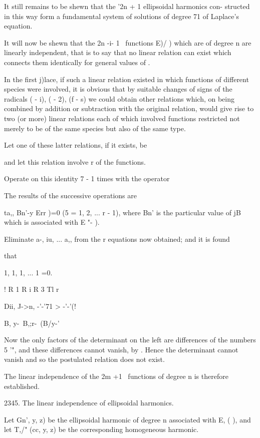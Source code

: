 {{{{{{{It still remains to be shewn that the '2n + 1 ellipsoidal harmonics
con- structed in this way form a fundamental system of solutions of
degree 71 of Laplace's equation.


It will now be shewn that the 2n -i- 1 \Lame\ functions E)/ ) which are
of degree n are linearly independent, that is to say that no linear
relation can exist which connects them identically for general values
of .

In the first j)lace, if such a linear relation existed in which
functions of different species were involved, it is obvious that by
suitable changes of signs of the radicals \/( - i), \/( - 2), \/(f -
s) we could obtain other relations which, on being combined by
addition or subtraction with the original relation, would give rise to
two (or more) linear relations each of which involved functions
restricted not merely to be of the same species but also of the same
type.

Let one of these latter relations, if it exists, be

and let this relation involve r of the functions.

Operate on this identity 7 - 1 times with the operator

The results of the successive operations are

ta,, Bn'-y Err )=0 (5 = 1, 2, ... r - 1), where Bn' is the particular
value of jB which is associated with E "- ).

%
%

Eliminate a-, iu, ... a,, from the r equations now obtained; and it
is found

that

1, 1, 1, ... 1 =0.

! R 1 R i R 3 Tl r

 Dii, J->n, -'-'71 >  -'-'(!

 B, y-\ B,;r-\ (B/y-'

Now the only factors of the determinant on the left are differences of
the numbers 5 '", and these differences cannot vanish, by .
Hence the determinant cannot vanish and so the postulated relation
does not exist.

The linear independence of the 2m +1 \Lame\ functions of degree n is
therefore established.

2345. The linear independence of ellipsoidal harmonics.

Let Gn', y, z) be the ellipsoidal harmonic of degree n associated
with E, ( ), and let T,/" (cc, y, z) be the corresponding homogeneous
harmonic.

}}}}}}}
